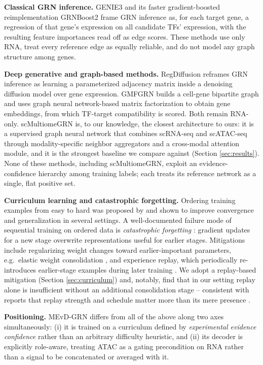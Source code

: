 \documentclass{article}
\theoremstyle{plain}
\theoremstyle{definition}
\begin{document}
\textbf{Classical GRN inference.} GENIE3 \cite{huynhthu2010genie3} and its
faster gradient-boosted reimplementation GRNBoost2 \cite{moerman2019grnboost2}
frame GRN inference as, for each target gene, a regression of that gene's
expression on all candidate TFs' expression, with the resulting feature
importances read off as edge scores. These methods use only RNA, treat every
reference edge as equally reliable, and do not model any graph structure among
genes.

\textbf{Deep generative and graph-based methods.} RegDiffusion
\cite{zhu2024regdiffusion} reframes GRN inference as learning a parameterized
adjacency matrix inside a denoising diffusion model over gene expression.
GMFGRN \cite{li2024gmfgrn} builds a cell-gene bipartite graph and uses graph
neural network-based matrix factorization to obtain gene embeddings, from which
TF-target compatibility is scored. Both remain RNA-only. scMultiomeGRN
\cite{xu2025scmultiomegrn} is, to our knowledge, the closest architecture to
ours: it is a supervised graph neural network that combines scRNA-seq and
scATAC-seq through modality-specific neighbor aggregators and a cross-modal
attention module, and it is the strongest baseline we compare against (Section
\ref{sec:results}). None of these methods, including scMultiomeGRN, exploit an
evidence-confidence hierarchy among training labels; each treats its reference
network as a single, flat positive set.

\textbf{Curriculum learning and catastrophic forgetting.} Ordering training
examples from easy to hard was proposed by \citet{bengio2009curriculum} and
shown to improve convergence and generalization in several settings. A
well-documented failure mode of sequential training on ordered data is
\emph{catastrophic forgetting} \cite{mccloskey1989catastrophic}: gradient
updates for a new stage overwrite representations useful for earlier stages.
Mitigations include regularizing weight changes toward earlier-important
parameters, e.g.\ elastic weight consolidation \cite{kirkpatrick2017ewc}, and
experience replay, which periodically re-introduces earlier-stage examples
during later training \cite{rolnick2019replay}. We adopt a replay-based
mitigation (Section \ref{sec:curriculum}) and, notably, find that in our setting
replay alone is insufficient without an additional consolidation stage --
consistent with reports that replay strength and schedule matter more than its
mere presence \cite{rolnick2019replay}.

\textbf{Positioning.} MEvD-GRN differs from all of the above along two axes
simultaneously: (i) it is trained on a curriculum defined by \emph{experimental
evidence confidence} rather than an arbitrary difficulty heuristic, and (ii) its
decoder is explicitly role-aware, treating ATAC as a gating precondition on RNA
rather than a signal to be concatenated or averaged with it.
\end{document}
